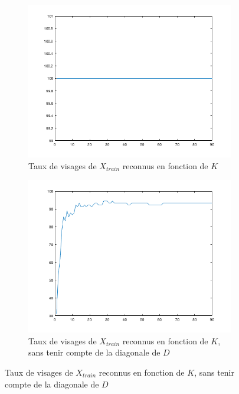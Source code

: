 \documentclass[a4paper]{article}
\begin{document}
\begin{figure}[H]
    \begin{subfigure}[c]{0.46\textwidth}
        \centering
        \includegraphics[width=\textwidth]{images/ex4_bonus5acc.png}
        \caption{Taux de visages de $X_{train}$ reconnus en fonction de
        $K$}
        \label{subfig:ex4-bonus5acc}
    \end{subfigure}
    \begin{subfigure}[c]{0.46\textwidth}
        \centering
        \includegraphics[width=\textwidth]{images/ex4_bonus5acc2.png}
        \caption{Taux de visages de $X_{train}$ reconnus en fonction de
        $K$, sans tenir compte de la diagonale de $D$}
        \label{subfig:ex4-bonus5acc2}
    \end{subfigure}

\end{figure}
\end{document}
